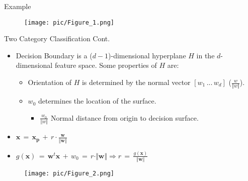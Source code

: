 \documentclass[serif, aspectratio=169]{beamer}
\begin{document}
\begin{frame}{Example}
    \begin{center}
    \begin{figure}[bh]
        \texttt{[image: pic/Figure\_1.png]}
    \end{figure}
    
    \endminipage
        
    \end{center}
\end{frame}


\begin{frame}{Two Category Classification Cont.}
    \begin{itemize}\itemsep1.5em
        \item Decision Boundary is a (\(d - 1\))-dimensional hyperplane \(H\) in the \(d\)-dimensional feature space. Some properties of \(H\) are:
        \medskip
        \begin{itemize}\itemsep0.7em
            \item Orientation of \(H\) is determined by the normal vector \([w_1 \, ... \, w_d]\) (\(\frac{w}{\Vert w \Vert}\)).
            \item \(w_0\) determines the location of the surface.
            \begin{itemize}
                \item \(\frac{w_0}{\Vert w \Vert}\) Normal distance from origin to decision surface.
            \end{itemize}
        \end{itemize}
    \end{itemize}
            \begin{itemize}
                \item[]
                \begin{center}
                    \(\mathbf{x} \, = \, \mathbf{x_p} \, + \, r \cdot \frac{\mathbf{w}}{\Vert\mathbf{w}\Vert}\)
                \end{center}
                \item[]
                \begin{center}
                    \(g(\mathbf{x}) \, = \, \mathbf{w}^t\mathbf{x} \, + \, w_0 \, = \, r \cdot \Vert\mathbf{w}\Vert \Rightarrow r \, = \, \frac{g(\mathbf{x})}{\Vert\mathbf{w}\Vert}\)
                \end{center}
            \end{itemize}
            \endminipage
            \hfill
            \begin{figure}[bh]
                \texttt{[image: pic/Figure\_2.png]}
            \end{figure}
            \endminipage
\end{frame}
\end{document}
